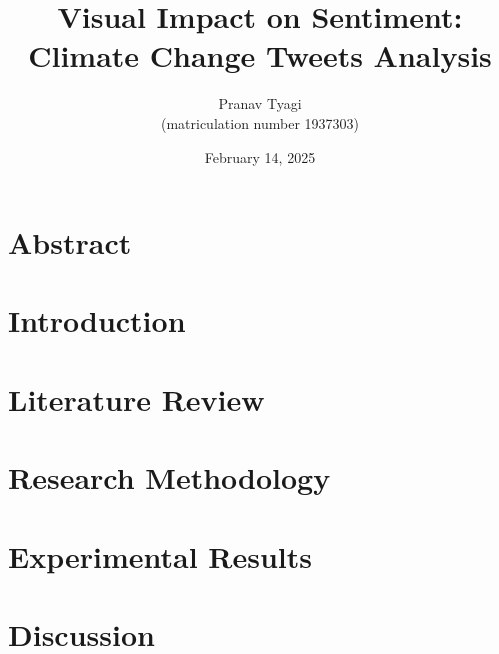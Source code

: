 \documentclass[a4paper,oneside,bibliography=totoc]{scrbook}
\begin{document}
\frontmatter \subject{Master Thesis} %
\title{Visual Impact on Sentiment: Climate Change Tweets Analysis}
\author{Pranav Tyagi\\
  (matriculation number 1937303)} \date{February 14, 2025}
\publishers{{\small Submitted to}\\
  Data and Web Science Group\\
  Prof.\ Dr.\ Margret Keuper\\
  University of Mannheim\\}
\maketitle

\chapter{Abstract}
\label{ch:abstract}



\begingroup%
\hypersetup{hidelinks}%
\tableofcontents%
\endgroup

\begingroup%
\hypersetup{hidelinks}%
\listoffigures%
\endgroup

\begingroup%
\hypersetup{hidelinks}%
\listoftables%
\endgroup

\mainmatter

\chapter{Introduction}
\label{ch:intro}



\chapter{Literature Review}
\label{ch:background}



\chapter{Research Methodology}
\label{ch:method}



\chapter{Experimental Results}
\label{ch:results}



\chapter{Discussion}
\label{ch:discussion}

\end{document}
